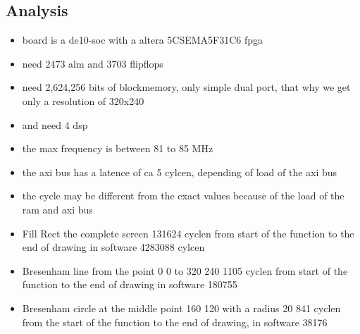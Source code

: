\subsection{Analysis}
\begin{itemize}
	\item board is a de10-soc with a altera 5CSEMA5F31C6 fpga
	\item need 2473 alm and 3703 flipflops
	\item need 2,624,256 bits of blockmemory, only simple dual port, that why we get only a resolution of 320x240
	\item and need 4 dsp
	\item the max frequency is between 81 to 85 MHz
	\item the axi bus has a latence of ca 5 cylcen, depending of load of the axi bus
	\item the cycle may be different from the exact values because of the load of the ram and axi bus
	\item Fill Rect  the complete screen 131624 cyclen from start of the function to the end of drawing in software 4283088 cylcen
	\item Bresenham line from the point 0 0 to 320 240 1105 cyclen from start of the function to the end of drawing in software 180755
	\item Bresenham circle at the middle point 160 120 with a radius 20 841 cyclen from the start of the function to the end of drawing, in software 38176
\end{itemize}